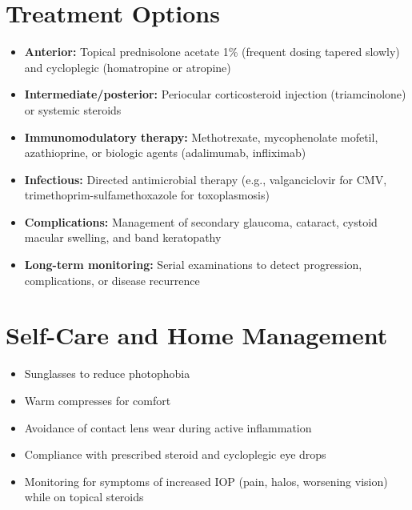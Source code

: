 \section*{Treatment Options}
\begin{itemize}
  \item \textbf{Anterior:} Topical prednisolone acetate 1\% (frequent dosing tapered slowly) and cycloplegic (homatropine or atropine)
  \item \textbf{Intermediate/posterior:} Periocular corticosteroid injection (triamcinolone) or systemic steroids
  \item \textbf{Immunomodulatory therapy:} Methotrexate, mycophenolate mofetil, azathioprine, or biologic agents (adalimumab, infliximab)
  \item \textbf{Infectious:} Directed antimicrobial therapy (e.g., valganciclovir for CMV, trimethoprim-sulfamethoxazole for toxoplasmosis)
  \item \textbf{Complications:} Management of secondary glaucoma, cataract, cystoid macular swelling, and band keratopathy
  \item \textbf{Long-term monitoring:} Serial examinations to detect progression, complications, or disease recurrence
\end{itemize}

\section*{Self-Care and Home Management}
\begin{itemize}
  \item Sunglasses to reduce photophobia
  \item Warm compresses for comfort
  \item Avoidance of contact lens wear during active inflammation
  \item Compliance with prescribed steroid and cycloplegic eye drops
  \item Monitoring for symptoms of increased IOP (pain, halos, worsening vision) while on topical steroids
\end{itemize}

